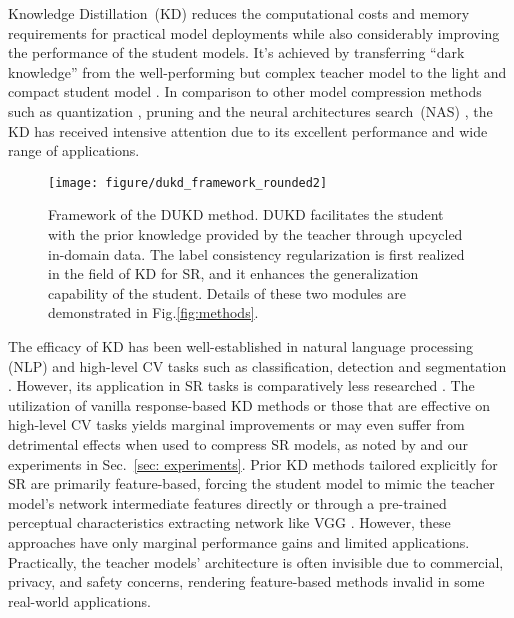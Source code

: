 \documentclass[10pt,twocolumn,letterpaper]{article}
\begin{document}
Knowledge Distillation~(KD) reduces the computational costs and memory requirements for practical model deployments while also considerably improving the performance of the student models. It's achieved by transferring ``dark knowledge'' from the well-performing but complex teacher model to the light and compact student model \cite{gao2019image, hui2019lightweight, zhang2021data}. In comparison to other model compression methods such as quantization \cite{gupta2015deep, hubara2016binarized,ignatov2021real,wu2016quantized}, pruning \cite{anwar2017structured, wang2021exploring,liu2019metapruning,qiao2022dcs} and the neural architectures search~(NAS) \cite{wu2019fbnet,howard2019searching,guo2020single}, the KD has received intensive attention due to its excellent performance and wide range of applications.

\begin{figure*}[t]  \centering
	\texttt{[image: figure/dukd\_framework\_rounded2]}
	\caption[Distillation Framework]{Framework of the DUKD method. DUKD facilitates the student with the prior knowledge provided by the teacher through upcycled in-domain data. The label consistency regularization is first realized in the field of KD for SR, and it enhances the generalization capability of the student. Details of these two modules are demonstrated in Fig.\ref{fig:methods}.}
\label{fig:framework}\vspace{-1em}
\end{figure*}


The efficacy of KD has been well-established in natural language processing (NLP) \cite{gou2021knowledge,sanh2019distilbert} and high-level CV tasks such as classification, detection and segmentation \cite{park2019relational,tung2019similarity,chen2017learning,huang2017like}. However, its application in SR tasks is comparatively less researched \cite{he2020fakd, wang2021towards, zhang2021data,lee2020learning}. The utilization of vanilla response-based KD methods \cite{hinton2015distilling} or those that are effective on high-level CV tasks \cite{romero2014fitnets, yim2017gift, zagoruyko2016paying} yields marginal improvements or may even suffer from detrimental effects when used to compress SR models, as noted by \citet{he2020fakd} and our experiments in Sec.~\ref{sec: experiments}.
Prior KD methods tailored explicitly for SR are primarily feature-based, 
forcing the student model to mimic the teacher model's network intermediate features directly
\cite{he2020fakd} or through a pre-trained perceptual characteristics extracting network like VGG \cite{Yao2022MTKDSRMK, wang2021towards}. However, these approaches have only marginal performance gains and limited applications. Practically, the teacher models' architecture is often invisible due to commercial, privacy, and safety concerns, rendering feature-based methods invalid in some real-world applications.
\end{document}
